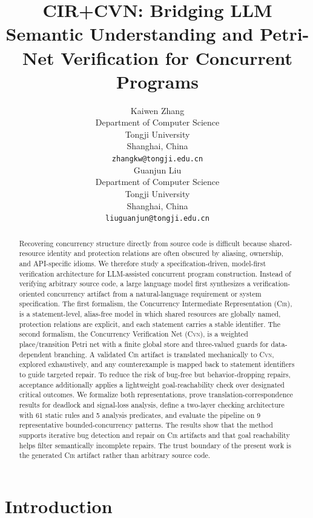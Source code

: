 \documentclass{article}
\title{CIR+CVN: Bridging LLM Semantic Understanding and Petri-Net Verification for Concurrent Programs}
\author{%
  Kaiwen Zhang \\
  Department of Computer Science\\
  Tongji University\\
  Shanghai, China \\
  \texttt{zhangkw@tongji.edu.cn} \\
  \AND
  Guanjun Liu \\
  Department of Computer Science\\
  Tongji University\\
  Shanghai, China \\
  \texttt{liuguanjun@tongji.edu.cn} \\
}
\begin{document}
\maketitle
\begin{abstract}
Recovering concurrency structure directly from source code is difficult because shared-resource identity and protection relations are often obscured by aliasing, ownership, and API-specific idioms. We therefore study a specification-driven, model-first verification architecture for LLM-assisted concurrent program construction. Instead of verifying arbitrary source code, a large language model first synthesizes a verification-oriented concurrency artifact from a natural-language requirement or system specification. The first formalism, the Concurrency Intermediate Representation (\textsc{Cir}), is a statement-level, alias-free model in which shared resources are globally named, protection relations are explicit, and each statement carries a stable identifier. The second formalism, the Concurrency Verification Net (\textsc{Cvn}), is a weighted place/transition Petri net with a finite global store and three-valued guards for data-dependent branching. A validated \textsc{Cir} artifact is translated mechanically to \textsc{Cvn}, explored exhaustively, and any counterexample is mapped back to statement identifiers to guide targeted repair. To reduce the risk of bug-free but behavior-dropping repairs, acceptance additionally applies a lightweight goal-reachability check over designated critical outcomes. We formalize both representations, prove translation-correspondence results for deadlock and signal-loss analysis, define a two-layer checking architecture with 61 static rules and 5 analysis predicates, and evaluate the pipeline on 9 representative bounded-concurrency patterns. The results show that the method supports iterative bug detection and repair on \textsc{Cir} artifacts and that goal reachability helps filter semantically incomplete repairs. The trust boundary of the present work is the generated \textsc{Cir} artifact rather than arbitrary source code.
\end{abstract}

\section{Introduction}
\label{sec:introduction}
\end{document}
